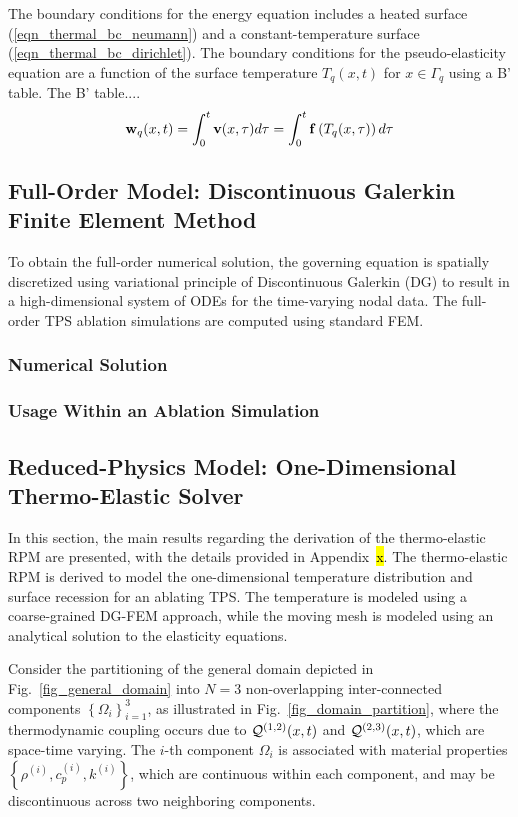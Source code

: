 The boundary conditions for the energy equation includes a heated surface (\cref{eqn_thermal_bc_neumann}) and a constant-temperature surface (\cref{eqn_thermal_bc_dirichlet}). The boundary conditions for the pseudo-elasticity equation are a function of the surface temperature $T_q(x,t)$ for $x\in\Gamma_q$ using a B' table. The B' table....
\begin{equation}
    \mathbf{w}_q(x,t) = \int_{0}^{t} \mathbf{v}(x,\tau)d\tau = \int_{0}^{t}\mathbf{f}\left(T_q(x,\tau)\right)d\tau\label{eqn_boundary_displacement}
\end{equation}


\subsection{Full-Order Model: Discontinuous Galerkin Finite Element Method}\label{sec_fom}

To obtain the full-order numerical solution, the governing equation is spatially discretized using variational principle of Discontinuous Galerkin (DG) to result in a high-dimensional system of ODEs for the time-varying nodal data. The full-order TPS ablation simulations are computed using standard FEM.

\subsubsection{Numerical Solution}

\subsubsection{Usage Within an Ablation Simulation}


\subsection{Reduced-Physics Model: One-Dimensional Thermo-Elastic Solver}

In this section, the main results regarding the derivation of the thermo-elastic RPM are presented, with the details provided in Appendix~\hl{x}. The thermo-elastic RPM is derived to model the one-dimensional temperature distribution and surface recession for an ablating TPS. The temperature is modeled using a coarse-grained DG-FEM approach, while the moving mesh is modeled using an analytical solution to the elasticity equations.

Consider the partitioning of the general domain depicted in Fig.~\ref{fig_general_domain} into $N=3$ non-overlapping inter-connected components $\left\{\Omega_i\right\}_{i=1}^{3}$, as illustrated in Fig.~\ref{fig_domain_partition}, where the thermodynamic coupling occurs due to $\mathcal{Q}^{(1,2)}(x,t)$ and $\mathcal{Q}^{(2,3)}(x,t)$, which are space-time varying. The $i$-th component $\Omega_i$ is associated with material properties $\left\{\rho^{(i)}, c^{(i)}_{p}, k^{(i)}\right\}$, which are continuous within each component, and may be discontinuous across two neighboring components.

